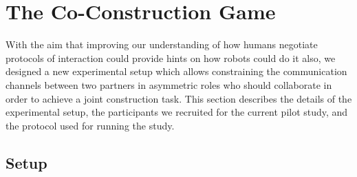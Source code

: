 
\section{The Co-Construction Game}

With the aim that improving our understanding of how humans negotiate protocols of interaction could provide hints on how robots could do it also, we designed a new experimental setup which allows constraining the communication channels between two partners in asymmetric roles who should collaborate in order to achieve a joint construction task. 
This section describes the details of the experimental setup, the participants we recruited for the current pilot study, and the protocol used for running the study.

\subsection{Setup}

